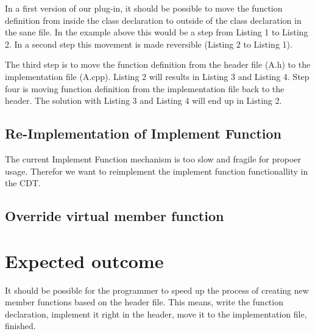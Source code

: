 \documentclass[a4paper,10pt]{scrreprt}
\begin{document}
In a first version of our plug-in, it should be possible to move the function definition from inside the class declaration to outside of the class declaration in the sane file. In the example above this would be a step from Listing 1 to Listing 2. In a second step this movement is made reversible (Listing 2 to Listing 1).

The third step is to move the function definition from the header file (A.h) to the implementation file (A.cpp). Listing 2 will results in Listing 3 and Listing 4. Step four is moving function definition from the implementation file back to the header. The solution with Listing 3 and Listing 4 will end up in Listing 2.

\subsection{Re-Implementation of Implement Function}

The current Implement Function mechanism is too slow and fragile for propoer usage. Therefor we want to reimplement the implement function functionallity in the CDT.

\subsection{Override virtual member function}

\section{Expected outcome}

It should be possible for the programmer to speed up the process of creating new member functions based on the header file. This means, write the function declaration, implement it right in the header, move it to the implementation file, finished.
\end{document}
